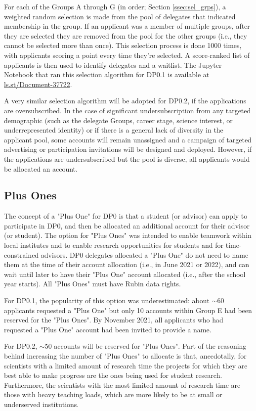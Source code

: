 \documentclass[DM,lsstdraft,authoryear,toc]{lsstdoc}
\begin{document}
For each of the Groups A through G (in order; Section \ref{ssec:sel_grps}), a weighted random selection is made from the pool of delegates that indicated membership in the group.
If an applicant was a member of multiple groups, after they are selected they are removed from the pool for the other groups (i.e., they cannot be selected more than once).
This selection process is done 1000 times, with applicants scoring a point every time they're selected.
A score-ranked list of applicants is then used to identify delegates and a waitlist.
The Jupyter Notebook that ran this selection algorithm for DP0.1 is available at \url{ls.st/Document-37722}.

A very similar selection algorithm will be adopted for DP0.2, if the applications are oversubscribed.
In the case of significant undersubscription from any targeted demographic (such as the delegate Groups, career stage, science interest, or underrepresented identity) or if there is a general lack of diversity in the applicant pool, some accounts will remain unassigned and a campaign of targeted advertising or participation invitations will be designed and deployed.
However, if the applications are undersubscribed but the pool is diverse, all applicants would be allocated an account.


\subsection{Plus Ones}\label{ssec:sel_po}

The concept of a "Plus One" for DP0 is that a student (or advisor) can apply to participate in DP0, and then be allocated an additional account for their advisor (or student).
The option for "Plus Ones" was intended to enable teamwork within local institutes and to enable research opportunities for students and for time-constrained advisors.
DP0 delegates allocated a "Plus One" do not need to name them at the time of their account allocation (i.e., in June 2021 or 2022), and can wait until later to have their "Plus One" account allocated (i.e., after the school year starts).
All "Plus Ones" must have Rubin data rights.

For DP0.1, the popularity of this option was underestimated: about $\sim$60 applicants requested a "Plus One" but only 10 accounts within Group E had been reserved for the "Plus Ones". 
By November 2021, all applicants who had requested a "Plus One" account had been invited to provide a name.

For DP0.2, $\sim$50 accounts will be reserved for "Plus Ones".
Part of the reasoning behind increasing the number of "Plus Ones" to allocate is that, anecdotally, for scientists with a limited amount of research time the projects for which they are best able to make progress are the ones being used for student research. 
Furthermore, the scientists with the most limited amount of research time are those with heavy teaching loads, which are more likely to be at small or underserved institutions.
\end{document}
